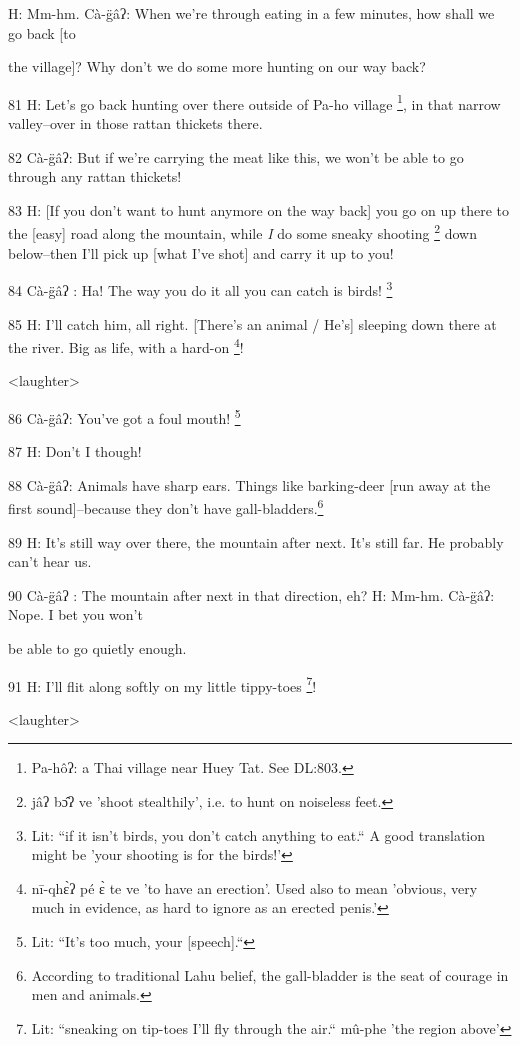 H: Mm-hm.  Cà-g̈âʔ: When we're through eating in a few minutes, how shall we
go back [to

the  village]? Why don't we do some more hunting on our way back?

81 H: Let's go back hunting over there outside of Pa-ho village \footnote{Pa-hôʔ: a Thai village near Huey Tat. See DL:803.}, in that narrow
valley--over in those rattan thickets there.

82  Cà-g̈âʔ: But if we're carrying the meat like this, we won't be able to
go through any rattan thickets!

83 H: [If you don't want to hunt anymore on the way back] you go on up there to
the [easy] road along the mountain, while \textit{I} do some sneaky shooting \footnote{jâʔ bɔ̂ʔ ve 'shoot stealthily', i.e. to hunt on noiseless feet.}
down below--then I'll pick up [what I've shot] and carry it up to you!

84 Cà-g̈âʔ : Ha! The way you do it all you can catch is birds! \footnote{Lit: ``if it isn't birds, you don't catch anything to eat.`` A good translation might be 'your shooting is for the birds!'}

85 H: I'll catch him, all right. [There's an animal / He's] sleeping down there
at the river. Big as life, with a hard-on \footnote{nī-qhɛ̀ʔ pé ɛ̀ te ve 'to have an erection'. Used also to mean 'obvious, very much in evidence, as hard to ignore as an erected penis.'}!

<laughter>

86  Cà-g̈âʔ: You've got a foul mouth! \footnote{Lit: ``It's too much, your [speech].``}

87 H: Don't I though!

88  Cà-g̈âʔ: Animals have sharp ears. Things like barking-deer [run away at
the first sound]--because they don't have gall-bladders.\footnote{According to traditional Lahu belief, the gall-bladder is the seat of courage in men and animals.}

89 H: It's still way over there, the mountain after next. It's still far. He probably
can't hear us.

90 Cà-g̈âʔ : The mountain after next in that direction, eh?  H: Mm-hm. Cà-g̈âʔ:
Nope. I bet you won't

be able to go quietly enough.

91 H: I'll flit along softly on my little tippy-toes \footnote{Lit: ``sneaking on tip-toes I'll fly through the air.`` mû-phe 'the region above'}!

\begin{center}
<laughter>
\end{center}


